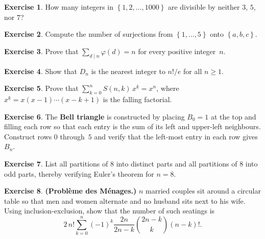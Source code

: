 \documentclass[12pt,a4paper,openany]{book}
\theoremstyle{definition}
\newtheorem{exercise}{Exercise}[chapter]
\theoremstyle{plain}
\theoremstyle{remark}
\newcommand{\set}[1]{\left\{#1\right\}}
\begin{document}
\begin{exercise}\label{exo:ie-divisibility}
How many integers in $\set{1, 2, \dots, 1000}$ are divisible by
neither $3$, $5$, nor $7$?
\end{exercise}

\begin{exercise}\label{exo:ie-surj-5-3}
Compute the number of surjections from $\set{1,\dots,5}$ onto
$\set{a,b,c}$.
\end{exercise}

\begin{exercise}\label{exo:totient-properties}
Prove that $\sum_{d \mid n}\varphi(d) = n$ for every positive
integer~$n$.
\end{exercise}

\begin{exercise}\label{exo:derangement-nearest-int}
Show that $D_n$ is the nearest integer to $n!/e$ for all $n \ge 1$.
\end{exercise}

\begin{exercise}\label{exo:stirling-identity}
Prove that $\sum_{k=0}^{n} S(n,k)\,x^{\underline{k}} = x^n$,
where $x^{\underline{k}} = x(x-1)\cdots(x-k+1)$ is the falling
factorial.
\end{exercise}

\begin{exercise}\label{exo:bell-triangle}
The \textbf{Bell triangle} is constructed by placing $B_0 = 1$ at the
top and filling each row so that each entry is the sum of its left and
upper-left neighbours.  Construct rows $0$ through~$5$ and verify that
the left-most entry in each row gives $B_n$.
\end{exercise}

\begin{exercise}\label{exo:partitions-10}
List all partitions of $8$ into distinct parts and all partitions of
$8$ into odd parts, thereby verifying Euler's theorem for $n=8$.
\end{exercise}

\begin{exercise}\label{exo:menage}
\textbf{(Probl\`eme des M\'enages.)}
$n$ married couples sit around a circular table so that men and women
alternate and no husband sits next to his wife.  Using
inclusion-exclusion, show that the number of such seatings is
\[
  2\,n!\sum_{k=0}^{n}(-1)^k \frac{2n}{2n-k}\binom{2n-k}{k}(n-k)!.
\]
\end{exercise}
\end{document}
